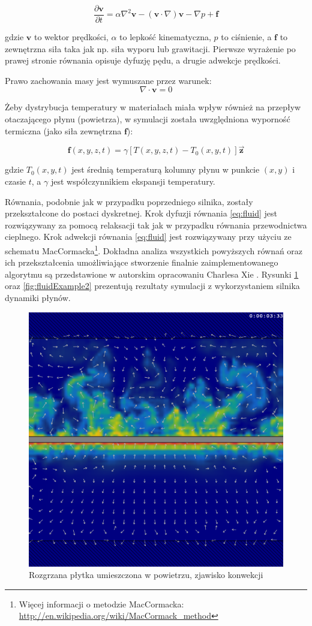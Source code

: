 \begin{equation}
\label{eq:fluid}
\frac{\partial \mathbf{v}}{\partial t}
= \alpha \nabla^2 \mathbf{v} - (\mathbf{v} \cdot \nabla) \mathbf{v} - \nabla p 
+ \mathbf{f}
\end{equation}

gdzie $\mathbf{v}$ to wektor prędkości, $\alpha$ to lepkość kinematyczna,
$p$ to ciśnienie, a $\mathbf{f}$ to zewnętrzna siła taka jak np. siła wyporu
lub grawitacji. Pierwsze wyrażenie po prawej stronie równania opisuje
dyfuzję pędu, a drugie adwekcje prędkości.

Prawo zachowania masy jest wymuszane przez warunek:
\begin{equation}
\nabla \cdot \mathbf{v} = 0
\end{equation}

Żeby dystrybucja temperatury w materiałach miała wpływ również na przepływ
otaczającego płynu (powietrza), w symulacji została uwzględniona wyporność
termiczna (jako siła zewnętrzna $\mathbf{f}$):

\begin{equation}
\mathbf{f}(x,y,z,t) = \gamma \left[ T(x,y,z,t) - T_0(x,y,t) \right] 
\mathbf{\vec{z}}
\end{equation}

gdzie $T_0(x,y,t)$ jest średnią temperaturą kolumny płynu w punkcie $(x,y)$
i czasie $t$, a $\gamma$ jest współczynnikiem ekspansji temperatury.

Równania, podobnie jak w przypadku poprzedniego silnika, zostały przekształcone
do postaci dyskretnej. Krok dyfuzji równania \ref{eq:fluid} jest rozwiązywany za
pomocą relaksacji tak jak w przypadku równania przewodnictwa cieplnego. Krok
adwekcji równania \ref{eq:fluid} jest rozwiązywany przy użyciu ze schematu
MacCormacka\footnote{Więcej informacji o metodzie MacCormacka:
\url{http://en.wikipedia.org/wiki/MacCormack_method}}. Dokładna analiza
wszystkich powyższych równań oraz ich przekształcenia umożliwiające stworzenie
finalnie zaimplementowanego algorytmu są przedstawione w autorskim opracowaniu
Charlesa Xie \cite{fluidEquation}. Rysunki \ref{fig:fluidExample1} oraz
\ref{fig:fluidExample2} prezentują rezultaty symulacji z wykorzystaniem
silnika dynamiki płynów.

\begin{figure}[!h]
\centering
\includegraphics[width=.6\textwidth]{img/fluidExample1}
\caption{Rozgrzana płytka umieszczona w powietrzu, zjawisko konwekcji}
\label{fig:fluidExample1}
\end{figure}

